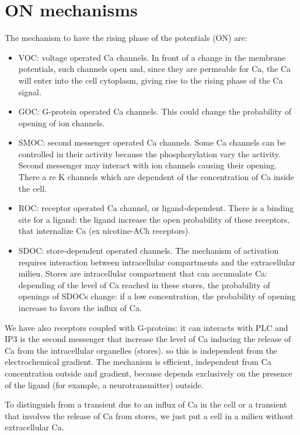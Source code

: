 \documentclass[a4paper, 12pt]{book}
\begin{document}
\section{ON mechanisms}
The mechanism to have the rising phase of the potentials (ON) are:
\begin{itemize}
\item{VOC: voltage operated Ca channels. In front of a change in the membrane potentials, such channels open and, since they are permeable for Ca, the Ca will enter into the cell cytoplasm, giving rise to the rising phase of the Ca signal.}
\item{GOC: G-protein operated Ca channels. This could change the probability of opening of ion channels.}
\item{SMOC: second messenger operated Ca channels. Some Ca channels can be controlled in their activity because the phosphorylation vary the activity. Second messenger may interact with ion channels causing their opening. There a re K channels which are dependent of the concentration of Ca inside the cell.}
\item{ROC: receptor operated Ca channel, or ligand-dependent. There is a binding site for a ligand: the ligand increase the open probability of these receptors, that internalize Ca (ex nicotine-ACh receptors).}
\item{SDOC: store-dependent operated channels. The mechanism of activation requires interaction between intracellular compartments and the extracellular milieu. Stores are intracellular compartment that can accumulate Ca: depending of the level of Ca reached in these stores, the probability of openings of SDOCs change: if a low concentration, the probability of opening increase to favors the influx of Ca.}
\end{itemize}

We have also receptors coupled with G-proteins: it can interacts with PLC and IP3 is the second messenger that increase the level of Ca inducing the release of Ca from the intracellular organelles (stores). so this is independent from the electrochemical gradient. The mechanism is efficient, independent from Ca concentration outside and gradient, because depends exclusively on the presence of the ligand (for example, a neurotransmitter) outside.

To distinguish from a transient due to an influx of Ca in the cell or a transient that involves the release of Ca from stores, we just put a cell in a milieu without extracellular Ca. 
\end{document}
